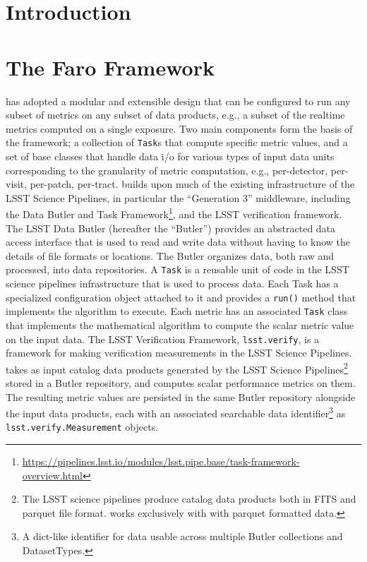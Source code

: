 \section{Introduction} \label{sec:intro}



\section{The Faro Framework} \label{sec:faro}

\faro has adopted a modular and extensible design that can be configured  to run any subset of metrics on any subset of data products, e.g., a  subset of the realtime metrics computed on a single exposure. 
Two main components form the basis of the \faro framework;  a collection of \texttt{Task}s that compute specific metric values, and a set of base classes that handle data i/o for various types of input data units corresponding to the granularity of metric computation, e.g., per-detector, per-visit, per-patch, per-tract. 
\faro builds upon much of the existing infrastructure of the LSST Science Pipelines, in particular the ``Generation 3'' middleware, including the Data Butler and Task Framework\footnote{\url{https://pipelines.lsst.io/modules/lsst.pipe.base/task-framework-overview.html}}\cite{dmtn-229}, and the LSST verification framework\cite{SQR-019}. 
The LSST Data Butler (hereafter the ``Butler'') provides an abstracted data access interface that is used to read and write data without having to know the details of file formats or locations.
The Butler organizes data, both raw and processed, into data repositories.
A \texttt{Task} is a reusable unit of code in the LSST science pipelines infrastructure that is used to process data.
Each Task has a specialized configuration object attached to it and provides a \texttt{run()} method that implements the algorithm to execute. 
Each \faro metric has an associated \texttt{Task} class that implements the mathematical algorithm to compute the scalar metric value on the input data.
The LSST Verification Framework, \texttt{lsst.verify}, is a framework for making verification measurements in the LSST Science Pipelines.
\faro takes as input catalog data products generated by the LSST Science Pipelines\footnote{The LSST science pipelines produce catalog data products both in FITS and parquet file format. \faro works exclusively with with parquet formatted data.} stored in a Butler repository, 
 and computes scalar performance metrics on them. 
The resulting metric values
are persisted in the same Butler repository alongside the input data products, each with an associated searchable data identifier\footnote{A dict-like identifier for data usable across multiple Butler collections and DatasetTypes.} as \texttt{lsst.verify.Measurement} objects.

